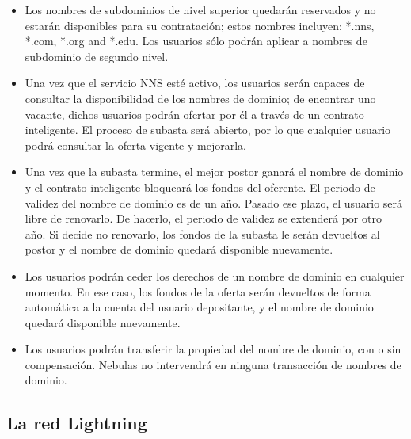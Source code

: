 \begin{itemize}

	\item Los nombres de subdominios de nivel superior quedarán reservados y no estarán disponibles para su contratación; estos nombres incluyen: *.nns, *.com, *.org and *.edu. Los usuarios sólo podrán aplicar a nombres de subdominio de segundo nivel.
	\item Una vez que el servicio NNS esté activo, los usuarios serán capaces de consultar la disponibilidad de los nombres de dominio; de encontrar uno vacante, dichos usuarios podrán ofertar por él a través de un contrato inteligente. El proceso de subasta será abierto, por lo que cualquier usuario podrá consultar la oferta vigente y mejorarla.
	\item Una vez que la subasta termine, el mejor postor ganará el nombre de dominio y el contrato inteligente bloqueará los fondos del oferente. El periodo de validez del nombre de dominio es de un año. Pasado ese plazo, el usuario será libre de renovarlo. De hacerlo, el periodo de validez se extenderá por otro año. Si decide no renovarlo, los fondos de la subasta le serán devueltos al postor y el nombre de dominio quedará disponible nuevamente.
	\item Los usuarios podrán ceder los derechos de un nombre de dominio en cualquier momento. En ese caso, los fondos de la oferta serán devueltos de forma automática a la cuenta del usuario depositante, y el nombre de dominio quedará disponible nuevamente.
	\item Los usuarios podrán transferir la propiedad del nombre de dominio, con o sin compensación. Nebulas no intervendrá en ninguna transacción de nombres de dominio.

\end{itemize}

\subsection{La red Lightning}

